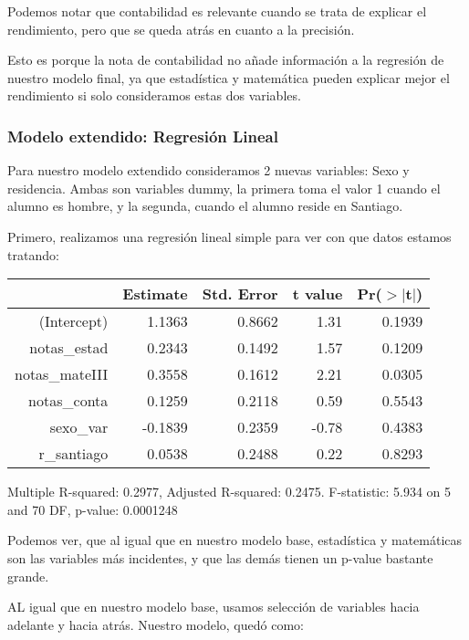 \documentclass[11pt]{article}
\begin{document}
Podemos notar que contabilidad es relevante cuando se trata de explicar el rendimiento, pero que se queda atrás en cuanto a la precisión.

Esto es porque la nota de contabilidad no añade información a la regresión de nuestro modelo final, ya que estadística y matemática pueden explicar mejor el rendimiento si solo consideramos estas dos variables.

\newpage

\subsubsection{Modelo extendido: Regresión Lineal}

Para nuestro modelo extendido consideramos 2 nuevas variables: Sexo y residencia. Ambas son variables dummy, la primera toma el valor 1 cuando el alumno es hombre, y la segunda, cuando el alumno reside en Santiago.

Primero, realizamos una regresión lineal simple para ver con que datos estamos tratando:

\begin{center}
\begin{table}[ht]
\centering
\begin{tabular}{rrrrr}
  \hline
 & Estimate & Std. Error & t value & Pr($>$$|$t$|$) \\ 
  \hline
(Intercept) & 1.1363 & 0.8662 & 1.31 & 0.1939 \\ 
  notas\_estad & 0.2343 & 0.1492 & 1.57 & 0.1209 \\ 
  notas\_mateIII & 0.3558 & 0.1612 & 2.21 & 0.0305 \\ 
  notas\_conta & 0.1259 & 0.2118 & 0.59 & 0.5543 \\ 
  sexo\_var & -0.1839 & 0.2359 & -0.78 & 0.4383 \\ 
  r\_santiago & 0.0538 & 0.2488 & 0.22 & 0.8293 \\ 
   \hline
\end{tabular}
\end{table}
\tiny{Multiple R-squared: 0.2977, Adjusted R-squared: 0.2475.
F-statistic: 5.934 on 5 and 70 DF, p-value: 0.0001248}
\end{center}

Podemos ver, que al igual que en nuestro modelo base, estadística y matemáticas son las variables más incidentes, y que las demás tienen un p-value bastante grande.

AL igual que en nuestro modelo base, usamos selección de variables hacia adelante y hacia atrás. Nuestro modelo, quedó como:
\end{document}
